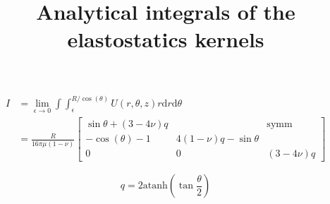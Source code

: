\documentclass{article}
\title{Analytical integrals of the elastostatics kernels}
\newcommand{\atanh}{\mathrm{atanh}}
\newcommand{\td}{\mathrm{d}}
\begin{document}
\maketitle

\begin{align}
I &= \lim_{\epsilon\to 0} \int \int_{\epsilon}^{R/\cos(\theta)} U(r,\theta,z) r \td r \td \theta \nonumber \\
&= \frac{R}{16\pi\mu(1-\nu)}
\begin{bmatrix}
\sin\theta + (3-4\nu) q &  &  \text{symm} \\ 
- \cos\!\left(\theta\right) - 1 &  4 (1-\nu) q - \sin\theta & \\
0 & 0 & \left(3-4\nu\right)q 
\end{bmatrix}
\end{align}

\begin{equation}
q = 2 \atanh\left(\tan\frac{\theta}{2}\right)
\end{equation}
\end{document}
